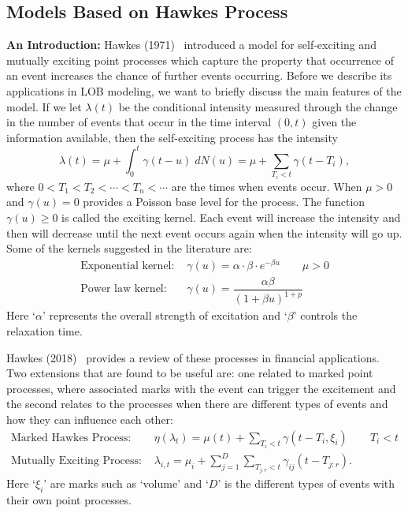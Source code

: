 \subsection{Models Based on Hawkes Process}

\noindent\textbf{An Introduction:} Hawkes (1971)~\cite{hawkes71} introduced a model for self-exciting and mutually exciting point processes which capture the property that occurrence of an event increases the chance of further events occurring. Before we describe its applications in LOB modeling, we want to briefly discuss the main features of the model. If we let $\lambda(t)$ be the conditional intensity measured through the change in the number of events that occur in the time interval $(0,t)$ given the information available, then the self-exciting process has the intensity
	\begin{equation} \label{eq:seintensity}
	\lambda(t)= \mu + \int_0^t \gamma(t-u) \;dN(u)= \mu + \sum_{T_i<t} \gamma(t-T_i),
	\end{equation}
where $0<T_1<T_2<\cdots<T_n<\cdots$ are the times when events occur. When $\mu>0$ and $\gamma(u)=0$ provides a Poisson base level for the process. The function $\gamma(u) \geq 0$ is called the exciting kernel. Each event will increase the intensity and then will decrease until the next event occurs again when the intensity will go up. Some of the kernels suggested in the literature are:
	\begin{equation} \label{eq:suggex}
	\begin{split}
	\text{Exponential kernel: }& \gamma(u)= \alpha \cdot \beta \cdot e^{-\beta u} \quad\quad \mu>0 \\
	\text{Power law kernel: }& \gamma(u)= \dfrac{\alpha \beta}{(1+\beta u)^{1+p}}
	\end{split}
	\end{equation}
Here `$\alpha$' represents the overall strength of excitation and `$\beta$' controls the relaxation time. 


Hawkes (2018)~\cite{hawkes18} provides a review of these processes in financial applications. Two extensions that are found to be useful are: one related to marked point processes, where associated marks with the event can trigger the excitement and the second relates to the processes when there are different types of events and how they can influence each other:
	\begin{equation} \label{eq:markedhawk}
	\begin{split}
	\text{Marked Hawkes Process: }& \eta(\lambda_t)= \mu(t) + \sum_{T_i<t} \gamma(t-T_i, \xi_i) \quad \quad T_i<t \\
	\text{Mutually Exciting Process: }& \lambda_{i,t}= \mu_i + \sum_{j=1}^D \sum_{T_{j:r}<t} \gamma_{ij} (t- T_{j:r}).
	\end{split}
	\end{equation}
Here `$\xi_i$' are marks such as `volume' and `$D$' is the different types of events with their own point processes. \twomedskip


